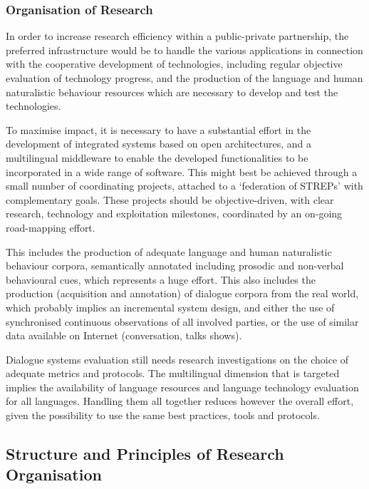 \documentclass[10pt, plain]{../../metanetpaper}
\begin{document}
\begin{multicols}{2}
\subsubsection{Organisation of Research}
\label{sec:organ-rese-pt3}

In order to increase research efficiency within a public-private partnership, the preferred infrastructure would be to handle the various applications in connection with the cooperative development of technologies, including regular objective evaluation of technology progress, and the production of the language and human naturalistic behaviour resources which are necessary to develop and test the technologies.
 
To maximise impact, it is necessary to have a substantial effort in the development of integrated systems based on open architectures, and a multilingual middleware to enable the developed functionalities to be incorporated in a wide range of software.  This might best be achieved through a small number of coordinating projects, attached to a ‘federation of STREPs’ with complementary goals. These projects should be objective-driven, with clear research, technology and exploitation milestones, coordinated by an on-going road-mapping effort.
 
This includes the production of adequate language and human naturalistic behaviour corpora, semantically annotated including prosodic and non-verbal behavioural cues, which represents a huge effort. This also includes the production (acquisition and annotation) of dialogue corpora from the real world, which probably implies an incremental system design, and either the use of synchronised continuous observations of all involved parties, or the use of similar data available on Internet (conversation, talks shows).
 
Dialogue systems evaluation still needs research investigations on the choice of adequate metrics and protocols. The multilingual dimension that is targeted implies the availability of language resources and language technology evaluation for all languages. Handling them all together reduces however the overall effort, given the possibility to use the same best practices, tools and protocols.

\subsection{Structure and Principles of Research Organisation}
\label{sec:struct-princ-research-org}


\end{multicols}
\end{document}
